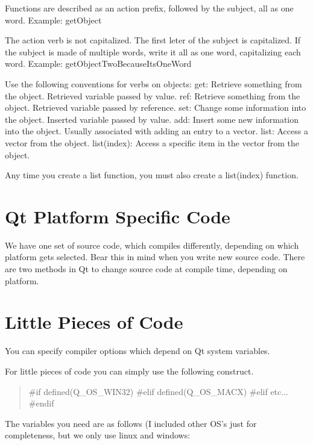 \begin{DoxyEnumerate}
\item Functions are described as an action prefix, followed by the subject, all as one word. Example\-: get\-Object
\item The action verb is not capitalized. The first leter of the subject is capitalized. If the subject is made of multiple words, write it all as one word, capitalizing each word. Example\-: get\-Object\-Two\-Because\-Its\-One\-Word
\item Use the following conventions for verbs on objects\-: get\-: Retrieve something from the object. Retrieved variable passed by value. ref\-: Retrieve something from the object. Retrieved variable passed by reference. set\-: Change some information into the object. Inserted variable passed by value. add\-: Insert some new information into the object. Usually associated with adding an entry to a vector. list\-: Access a vector from the object. list(index)\-: Access a specific item in the vector from the object.
\item Any time you create a list function, you must also create a list(index) function. 
\end{DoxyEnumerate}\hypertarget{qt_platform_code}{}\section{Qt Platform Specific Code}\label{qt_platform_code}
We have one set of source code, which compiles differently, depending on which platform gets selected. Bear this in mind when you write new source code. There are two methods in Qt to change source code at compile time, depending on platform.

\section*{Little Pieces of Code}

You can specify compiler options which depend on Qt system variables.

For little pieces of code you can simply use the following construct.

\begin{quotation}
\#if defined(\-Q\-\_\-\-O\-S\-\_\-\-W\-I\-N32) \#elif defined(\-Q\-\_\-\-O\-S\-\_\-\-M\-A\-C\-X) \#elif etc... \#endif

\end{quotation}


The variables you need are as follows (I included other O\-S's just for completeness, but we only use linux and windows\-:


